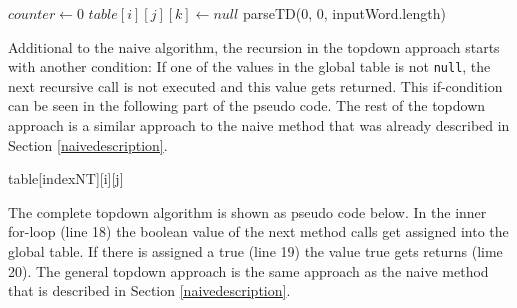 \documentclass[a4paper, 11pt]{article}
\begin{document}
\begin{center}
\label{alg:cap}
\begin{algorithmic}[1]
\State $counter \gets 0$
\State $table[i][j][k] \gets null$
\EndFor
\EndFor
\EndFor
\State \Return parseTD(0, 0, inputWord.length)
\end{algorithmic}
\hrulefill
\end{center}

Additional to the naive algorithm, the recursion in the topdown approach starts with another condition: If one of the values in the global table is not \texttt{null}, the next recursive call is not executed and this value gets returned. This if-condition can be seen in the following part of the pseudo code. The rest of the topdown approach is a similar approach to the naive method that was already described in Section \ref{naivedescription}.

\begin{center}
\label{alg:cap}
\begin{algorithmic}[1]
\State \Return table[indexNT][i][j]
\EndIf
\end{algorithmic}
\hrulefill
\end{center}

The complete topdown algorithm is shown as pseudo code below. In the inner for-loop (line 18) the boolean value of the next method calls get assigned into the global table. If there is assigned a true (line 19) the value true gets returns (lime 20). The general topdown approach is the same approach as the naive method that is described in Section \ref{naivedescription}.
\end{document}
